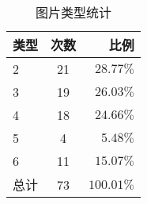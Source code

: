 
\begin{table}[H]
  \setlength{\tabcolsep}{25pt}
  \centering
  \begin{tabular}{ l c r }
    \hline
    \textbf{类型} & \textbf{次数} & \textbf{比例} \\ \hline \hline
    2 & 21 & $28.77\%$ \\
    3 & 19 & $26.03\%$ \\
    4 & 18 & $24.66\%$ \\
    5 & 4 & $5.48\%$ \\
    6 & 11 & $15.07\%$ \\
    总计 & 73 & $100.01\%$ \\
    \hline
  \end{tabular}
  \caption{图片类型统计}
  \label{tab:sys-retrieved-img-type}
\end{table}

